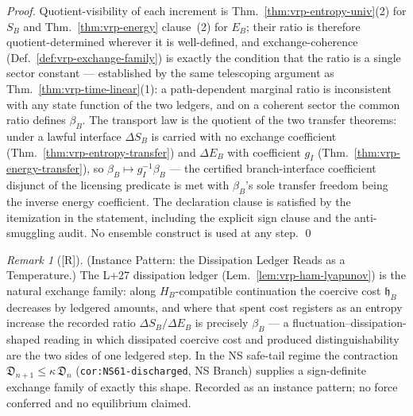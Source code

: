 \documentclass[12pt,oneside]{amsbook}
\theoremstyle{plain}
\theoremstyle{definition}
\theoremstyle{remark}
\newtheorem{remark}[theorem]{Remark}
\newcommand{\status}[1]{\textup{[#1]}}
\begin{document}
\begin{proof}
Quotient-visibility of each increment is
Thm.~\ref{thm:vrp-entropy-univ}(2) for $S_B$ and
Thm.~\ref{thm:vrp-energy} clause~(2) for $E_B$; their ratio is
therefore quotient-determined wherever it is well-defined, and
exchange-coherence (Def.~\ref{def:vrp-exchange-family}) is exactly
the condition that the ratio is a single sector constant ---
established by the same telescoping argument as
Thm.~\ref{thm:vrp-time-linear}(1): a path-dependent marginal ratio
is inconsistent with any state function of the two ledgers, and on
a coherent sector the common ratio defines $\beta_B$.  The
transport law is the quotient of the two transfer theorems: under
a lawful interface $\Delta S_B$ is carried with no exchange
coefficient (Thm.~\ref{thm:vrp-entropy-transfer}) and $\Delta E_B$
with coefficient $g_I$ (Thm.~\ref{thm:vrp-energy-transfer}), so
$\beta_B \mapsto g_I^{-1}\beta_B$ --- the certified
branch-interface coefficient disjunct of the licensing predicate
is met with $\beta_B$'s sole transfer freedom being the inverse
energy coefficient.  The declaration clause is satisfied by the
itemization in the statement, including the explicit sign clause
and the anti-smuggling audit.  No ensemble construct is used at
any step. \qed
\end{proof}

\begin{remark}[\status{R}]\label{rmk:vrp-temperature-dissipation}
\textup{(Instance Pattern: the Dissipation Ledger Reads as a
Temperature.)}
The L+27 dissipation ledger
(Lem.~\ref{lem:vrp-ham-lyapunov}) is the natural exchange family:
along $H_B$-compatible continuation the coercive cost
$\mathfrak{h}_B$ decreases by ledgered amounts, and where that
spent cost registers as an entropy increase the recorded ratio
$\Delta S_B / \Delta E_B$ is precisely $\beta_B$ --- a
fluctuation--dissipation-shaped reading in which dissipated
coercive cost and produced distinguishability are the two sides of
one ledgered step.  In the NS safe-tail regime the contraction
$\mathfrak{D}_{n+1} \le \kappa\,\mathfrak{D}_n$
(\texttt{cor:NS61-discharged}, NS Branch) supplies a sign-definite
exchange family of exactly this shape.  Recorded as an instance
pattern; no force conferred and no equilibrium claimed.
\end{remark}
\end{document}
